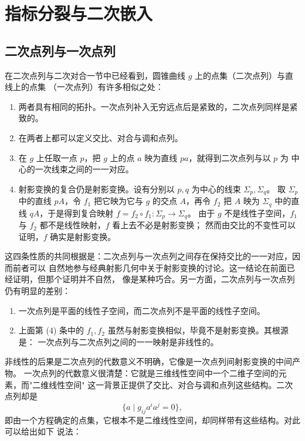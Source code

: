 \chapter{指标分裂与二次嵌入}

\section{二次点列与一次点列}

在二次点列与二次对合一节中已经看到，圆锥曲线 $g$ 上的点集（二次点列）与直线上的点集
（一次点列）有许多相似之处：

\begin{enumerate}[label=(\arabic*),leftmargin=2.4em]
\item 两者具有相同的拓扑。一次点列补入无穷远点后是紧致的，二次点列同样是紧致的。
\item 在两者上都可以定义交比、对合与调和点列。
\item 在 $g$ 上任取一点 $p$，把 $g$ 上的点 $a$ 映为直线 $pa$，就得到二次点列与以 $p$ 为
      中心的一次线束之间的一一对应。
\item 射影变换的复合仍是射影变换。设有分别以 $p,q$ 为中心的线束 $\Sigma_p,\Sigma_q$。
      取 $\Sigma_p$ 中的直线 $pA$，令 $f_1$ 把它映为它与 $g$ 的交点 $A$，再令 $f_2$ 把 $A$
      映为 $\Sigma_q$ 中的直线 $qA$，于是得到复合映射 $f=f_2\circ f_1:\Sigma_p\to\Sigma_q$。
      由于 $g$ 不是线性子空间，$f_1$ 与 $f_2$ 都不是线性映射，$f$ 看上去不必是射影变换；
      然而由交比的不变性可以证明，$f$ 确实是射影变换。
\end{enumerate}

这四条性质的共同根据是：二次点列与一次点列之间存在保持交比的一一对应，因而前者可以
自然地参与经典射影几何中关于射影变换的讨论。这一结论在前面已经证明，但那个证明并不自然，
像是某种巧合。另一方面，二次点列与一次点列仍有明显的差别：

\begin{enumerate}[label=(\arabic*),leftmargin=2.4em]
\item 一次点列是平面的线性子空间，而二次点列不是平面的线性子空间。
\item 上面第 (4) 条中的 $f_1,f_2$ 虽然与射影变换相似，毕竟不是射影变换。其根源是：
      一次点列与二次点列之间的一一映射是非线性的。
\end{enumerate}

非线性的后果是二次点列的代数意义不明确，它像是一次点列间射影变换的中间产物。
一次点列的代数意义很清楚：它就是三维线性空间中一个二维子空间的元素，而"二维线性空间"
这一背景正提供了交比、对合与调和点列这些结构。二次点列却是
\[
\{a\mid g_{ij}a^ia^j=0\},
\]
即由一个方程确定的点集，它根本不是二维线性空间，却同样带有这些结构。对此可以给出如下
说法：

